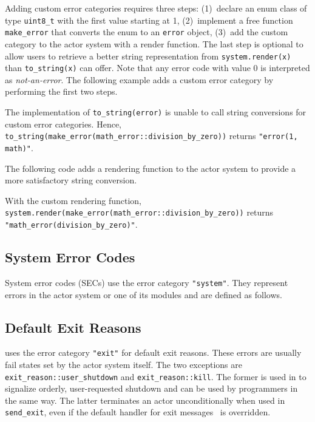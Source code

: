 Adding custom error categories requires three steps: (1)~declare an enum class of type \lstinline^uint8_t^ with the first value starting at 1, (2)~implement a free function \lstinline^make_error^ that converts the enum to an \lstinline^error^ object, (3)~add the custom category to the actor system with a render function. The last step is optional to allow users to retrieve a better string representation from \lstinline^system.render(x)^ than \lstinline^to_string(x)^ can offer. Note that any error code with value 0 is interpreted as \emph{not-an-error}. The following example adds a custom error category by performing the first two steps.



The implementation of \lstinline^to_string(error)^ is unable to call string conversions for custom error categories. Hence, \lstinline^to_string(make_error(math_error::division_by_zero))^ returns \lstinline^"error(1, math)"^.

The following code adds a rendering function to the actor system to provide a more satisfactory string conversion.



With the custom rendering function, \lstinline^system.render(make_error(math_error::division_by_zero))^ returns \lstinline^"math_error(division_by_zero)"^.

\clearpage
\subsection{System Error Codes}
\label{system-error}

System error codes (SECs) use the error category \lstinline^"system"^. They represent errors in the actor system or one of its modules and are defined as follows.



\clearpage
\subsection{Default Exit Reasons}
\label{exit-reason}

\lib uses the error category \lstinline^"exit"^ for default exit reasons. These errors are usually fail states set by the actor system itself. The two exceptions are \lstinline^exit_reason::user_shutdown^ and \lstinline^exit_reason::kill^. The former is used in \lib to signalize orderly, user-requested shutdown and can be used by programmers in the same way. The latter terminates an actor unconditionally when used in \lstinline^send_exit^, even if the default handler for exit messages~ is overridden.


